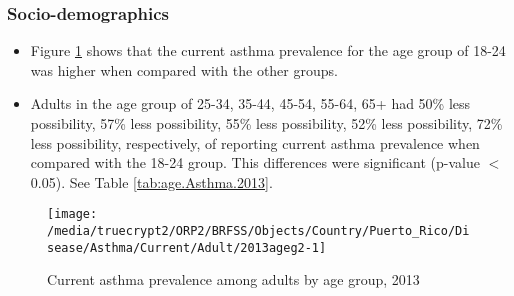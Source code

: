 
\newpage
\subsubsection{Socio-demographics}

\begin{itemize}

\item Figure \ref{fig:age.Asthma.2013} shows that the current asthma prevalence for the age group of
18-24
was higher when compared with the other groups.

\item Adults in the age group of 25-34, 35-44, 45-54, 55-64, 65+ had 50\% less possibility, 57\% less possibility, 55\% less possibility, 52\% less possibility, 72\% less possibility, respectively, of reporting current asthma prevalence when compared with the 18-24 group. This differences were significant (p-value $<$ 0.05). See Table \ref{tab:age.Asthma.2013}.


\end{itemize}


\begin{figure}[H]
\caption{Current asthma prevalence among adults by age group, 
2013}
\begin{knitrout}
\color{fgcolor}

{\centering \texttt{[image: /media/truecrypt2/ORP2/BRFSS/Objects/Country/Puerto\_Rico/Disease/Asthma/Current/Adult/2013ageg2-1]} 

}



\end{knitrout}
\label{fig:age.Asthma.2013}
\end{figure}

